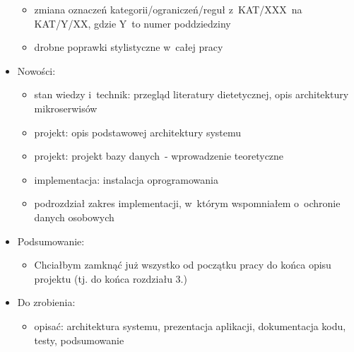 \begin{itemize}
\begin{itemize}
	\item zmiana oznaczeń kategorii/ograniczeń/reguł z~KAT/XXX~na KAT/Y/XX, gdzie Y~to numer poddziedziny
	\item drobne poprawki stylistyczne w~całej pracy
	\end{itemize}
\item Nowości:
    \begin{itemize}
	\item stan wiedzy i~technik: przegląd literatury dietetycznej, opis architektury mikroserwisów
	\item projekt: opis podstawowej architektury systemu
	\item projekt: projekt bazy danych~- wprowadzenie teoretyczne
	\item implementacja: instalacja oprogramowania
	\item podrozdział zakres implementacji, w~którym wspomniałem o~ochronie danych osobowych
	\end{itemize}
\item Podsumowanie:
    \begin{itemize}
	\item Chciałbym zamknąć już wszystko od początku pracy do końca opisu projektu (tj. do końca rozdziału 3.)
	\end{itemize}
\item Do zrobienia:
    \begin{itemize}
	\item opisać: architektura systemu, prezentacja aplikacji, dokumentacja kodu, testy, podsumowanie
	\end{itemize}
\end{itemize}

\cleardoublepage
{}
